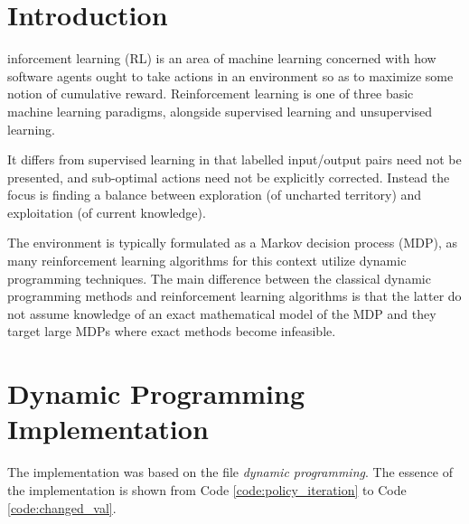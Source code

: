 \documentclass[journal,10pt,onecolumn,draftclsnofoot,]{IEEEtran}
\begin{document}
\section{Introduction}

inforcement learning (RL) is an area of machine learning
concerned with how software agents ought to take actions in an environment so
as to maximize some notion of cumulative reward. Reinforcement learning is one
of three basic machine learning paradigms, alongside supervised learning
and unsupervised learning.

It differs from supervised learning in that labelled input/output pairs need
not be presented, and sub-optimal actions need not be explicitly corrected.
Instead the focus is finding a balance between exploration (of uncharted
territory) and exploitation (of current knowledge).

The environment is typically formulated as a Markov decision process (MDP),
as many reinforcement learning algorithms for this context utilize dynamic
programming techniques. The main difference between the classical dynamic
programming methods and reinforcement learning algorithms is that the latter
do not assume knowledge of an exact mathematical model of the MDP and they
target large MDPs where exact methods become infeasible.

\section{Dynamic Programming Implementation}

The implementation was based on the file \textit{dynamic programming}.
The essence of the implementation is shown from Code \ref{code:policy_iteration} to Code \ref{code:changed_val}.




\end{document}
